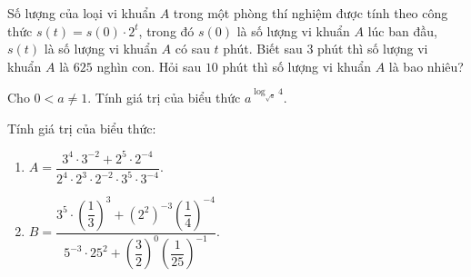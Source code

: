 \begin{bt}%
	Số lượng của loại vi khuẩn $A$ trong một phòng thí nghiệm được tính theo công thức $s(t)=s(0)\cdot 2^t$, trong đó $s(0)$ là số lượng vi khuẩn $A$ lúc ban đầu, $s(t)$ là số lượng vi khuẩn $A$ có sau $t$ phút. Biết sau $3$ phút thì số lượng vi khuẩn $A$ là $625$  nghìn con. Hỏi sau $10$ phút thì số lượng vi khuẩn $A$ là bao nhiêu?
\end{bt}

\begin{bt}%
	Cho $0<a\neq 1$. Tính giá trị của biểu thức  $a^{\log_{\sqrt{a}}4}$.
\end{bt}

\begin{bt}%
	Tính  giá trị của biểu thức:
	\begin{enumerate}
		\item $A=\dfrac{3^4\cdot3^{-2}+2^5\cdot2^{-4}}{2^4\cdot2^3\cdot2^{-2}\cdot3^5\cdot3^{-4}}$. 
		 \item $B=\dfrac{3^5 \cdot\left(\dfrac{1}{3}\right)^3+\left(2^2\right)^{-3}\left(\dfrac{1}{4}\right)^{-4}}{5^{-3} \cdot 25^2+\left(\dfrac{3}{2}\right)^0\left(\dfrac{1}{25}\right)^{-1}}$.
	\end{enumerate}
\end{bt}

